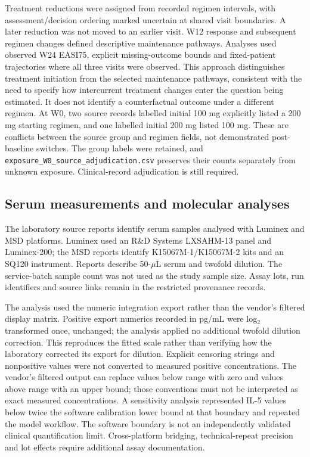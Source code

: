 \documentclass[10pt,a4paper]{article}
\begin{document}
Treatment reductions were assigned from recorded regimen intervals, with assessment/decision ordering marked uncertain at shared visit boundaries. A later reduction was not moved to an earlier visit. W12 response and subsequent regimen changes defined descriptive maintenance pathways. Analyses used observed W24 EASI75, explicit missing-outcome bounds and fixed-patient trajectories where all three visits were observed. This approach distinguishes treatment initiation from the selected maintenance pathways, consistent with the need to specify how intercurrent treatment changes enter the question being estimated.\citep{iche9r1} It does not identify a counterfactual outcome under a different regimen. At W0, two source records labelled initial 100 mg explicitly listed a 200 mg starting regimen, and one labelled initial 200 mg listed 100 mg. These are conflicts between the source group and regimen fields, not demonstrated post-baseline switches. The group labels were retained, and \texttt{exposure\_W0\_source\_adjudication.csv} preserves their counts separately from unknown exposure. Clinical-record adjudication is still required.

\subsection{Serum measurements and molecular analyses}
The laboratory source reports identify serum samples analysed with Luminex and MSD platforms. Luminex used an R\&D Systems LXSAHM-13 panel and Luminex-200; the MSD reports identify K15067M-1/K15067M-2 kits and an SQ120 instrument. Reports describe 50-$\mu$L serum and twofold dilution. The service-batch sample count was not used as the study sample size. Assay lots, run identifiers and source links remain in the restricted provenance records.

The analysis used the numeric integration export rather than the vendor's filtered display matrix. Positive export numerics recorded in pg/mL were log$_2$ transformed once, unchanged; the analysis applied no additional twofold dilution correction. This reproduces the fitted scale rather than verifying how the laboratory corrected its export for dilution. Explicit censoring strings and nonpositive values were not converted to measured positive concentrations. The vendor's filtered output can replace values below range with zero and values above range with an upper bound; those conventions must not be interpreted as exact measured concentrations. A sensitivity analysis represented IL-5 values below twice the software calibration lower bound at that boundary and repeated the model workflow. The software boundary is not an independently validated clinical quantification limit. Cross-platform bridging, technical-repeat precision and lot effects require additional assay documentation.
\end{document}
